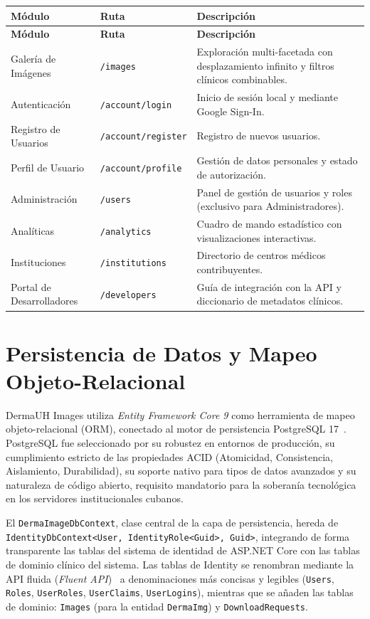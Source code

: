 \begin{longtable}{|p{3.5cm}|p{3.5cm}|p{7.5cm}|}
\hline
\textbf{Módulo} & \textbf{Ruta} & \textbf{Descripción} \\
\hline
\endfirsthead
\hline
\textbf{Módulo} & \textbf{Ruta} & \textbf{Descripción} \\
\hline
\endhead
Galería de Imágenes & \texttt{/images} & Exploración multi-facetada con desplazamiento infinito y filtros clínicos combinables. \\
\hline
Autenticación & \texttt{/account/login} & Inicio de sesión local y mediante Google Sign-In. \\
\hline
Registro de Usuarios & \texttt{/account/register} & Registro de nuevos usuarios. \\
\hline
Perfil de Usuario & \texttt{/account/profile} & Gestión de datos personales y estado de autorización. \\
\hline
Administración & \texttt{/users} & Panel de gestión de usuarios y roles (exclusivo para Administradores). \\
\hline
Analíticas & \texttt{/analytics} & Cuadro de mando estadístico con visualizaciones interactivas. \\
\hline
Instituciones & \texttt{/institutions} & Directorio de centros médicos contribuyentes. \\
\hline
Portal de Desarrolladores & \texttt{/developers} & Guía de integración con la API y diccionario de metadatos clínicos. \\
\hline
\end{longtable}

\section{Persistencia de Datos y Mapeo Objeto-Relacional}
DermaUH Images utiliza \textit{Entity Framework Core 9} como herramienta de mapeo objeto-relacional (ORM), 
conectado al motor de persistencia PostgreSQL 17~\cite{postgresql_docs}. PostgreSQL fue seleccionado por 
su robustez en entornos de producción, su cumplimiento estricto de las propiedades ACID (Atomicidad, 
Consistencia, Aislamiento, Durabilidad), su soporte nativo para tipos de datos avanzados y su naturaleza 
de código abierto, requisito mandatorio para la soberanía tecnológica en los servidores institucionales 
cubanos.

El \texttt{DermaImageDbContext}, clase central de la capa de persistencia, hereda de 
\texttt{IdentityDbContext<User, IdentityRole<Guid>, Guid>}, integrando de forma transparente las tablas 
del sistema de identidad de ASP.NET Core con las tablas de dominio clínico del sistema. Las tablas de 
Identity se renombran mediante la API fluida (\textit{Fluent API})~\cite{ef_core_fluent_api} a denominaciones 
más concisas y legibles (\texttt{Users}, \texttt{Roles}, \texttt{UserRoles}, \texttt{UserClaims}, 
\texttt{UserLogins}), mientras que se añaden las tablas de dominio: \texttt{Images} 
(para la entidad \texttt{DermaImg}) y \texttt{DownloadRequests}.

